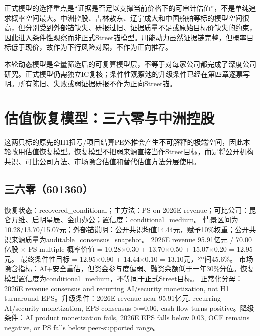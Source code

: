 \normalsize

正式模型的选择重点是“证据是否足以支撑当前价格下的可审计估值”，不是单纯追求概率空间最大。中洲控股、吉林敖东、辽宁成大和中国船舶等标的模型空间很高，但分别受到外部锚缺失、研报过旧、证据质量不足或原始目标价缺失的约束，因此进入条件性观察而非正式Street锚模型。川能动力虽然证据链完整，但概率目标低于现价，故作为下行风险对照，不作为正向推荐。

本轮动态模型是全量筛选后的可复算模型层，不等于对每家公司都完成了深度公司研究。正式模型仍需独立IC复核；条件性观察池的升级条件已经在第四章逐票写明。所有陈旧、失败或弱证据研报不作为正向Street锚。
\section{估值恢复模型：三六零与中洲控股}

这两只标的原先的H1扭亏/项目结算PE外推会产生不可解释的极端空间，因此本轮改用估值恢复模型。恢复模型不把弱来源直接当作Street目标，而是将公开机构共识、可比公司方法、市场隐含估值和替代估值方法分层使用。
\subsection{三六零（601360）}
恢复状态：recovered\_conditional；主方法：PS on 2026E revenue；可比公司：昆仑万维、启明星辰、金山办公；置信度：conditional\_medium。
情景区间为10.28/13.70/15.07元；外部锚说明：公开共识均值14.44元，赋予10\%权重；公开共识来源质量为auditable\_consensus\_snapshot。
2026E revenue 95.91亿元 / 70.00亿股 × PS multiple
概率价值 = 10.28×0.30 + 13.70×0.50 + 15.07×0.20 = 12.95元。
最终条件性目标 = 12.95×0.90 + 14.44×0.10 = 13.10元，空间45.6\%。
市场隐含指标：AI+安全重估，但资金参与度偏弱、融资余额低于一年30\%分位。恢复模型置信度为conditional\_medium，不等同于正式Street目标。
正常化分母：2026E revenue consensus and recurring AI/security monetization, not H1 turnaround EPS。升级条件：2026E revenue near 95.91亿元, recurring AI/security monetization, EPS consensus >=0.06, cash flow turns positive。降级条件：AI product monetization fails, 2026E EPS falls below 0.03, OCF remains negative, or PS falls below peer-supported range。
